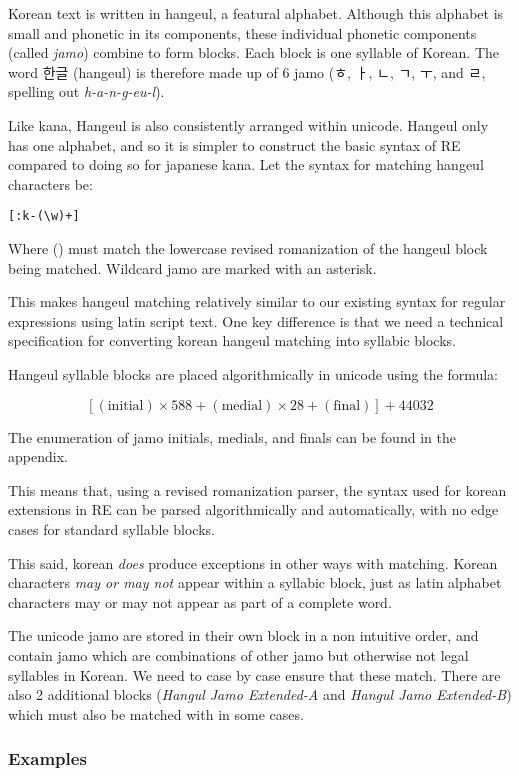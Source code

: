 \documentclass{article}
\begin{document}
Korean text is written in hangeul, a featural alphabet. Although this alphabet
is small and phonetic in its components, these individual phonetic components
(called \textit{jamo}) combine to form blocks. Each block is one syllable of
Korean. The word 한글 (hangeul) is therefore made up of 6 jamo (ㅎ, ㅏ, ㄴ, ㄱ,
ㅜ, and ㄹ, spelling out \textit{h-a-n-g-eu-l}).

Like kana, Hangeul is also consistently arranged within unicode. Hangeul only
has one alphabet, and so it is simpler to construct the basic syntax of RE
compared to doing so for japanese kana. Let the syntax for matching hangeul
characters be:

\texttt{[:k-(\textbackslash w)+]}

Where (\w) must match the lowercase revised romanization of the hangeul block
being matched. Wildcard jamo are marked with an asterisk.

This makes hangeul matching relatively similar to our existing syntax for
regular expressions using latin script text. One key difference is that we need
a technical specification for converting korean hangeul matching into syllabic
blocks.

Hangeul syllable blocks are placed algorithmically in unicode using the formula:

$$ [(\text{initial}) × 588 + (\text{medial}) × 28 + (\text{final})] + 44032 $$

The enumeration of jamo initials, medials, and finals can be found in the
appendix.

This means that, using a revised romanization parser, the syntax used for korean
extensions in RE can be parsed algorithmically and automatically, with no edge
cases for standard syllable blocks.

This said, korean \textit{does} produce exceptions in other ways with matching.
Korean characters \textit{may or may not} appear within a syllabic block, just
as latin alphabet characters may or may not appear as part of a complete word.

The unicode jamo are stored in their own block in a non intuitive order, and
contain jamo which are combinations of other jamo but otherwise not legal
syllables in Korean. We need to case by case ensure that these match. There are
also 2 additional blocks (\textit{Hangul Jamo Extended-A} and \textit{Hangul
Jamo Extended-B}) which must also be matched with in some cases.

\subsubsection{Examples}
\end{document}
